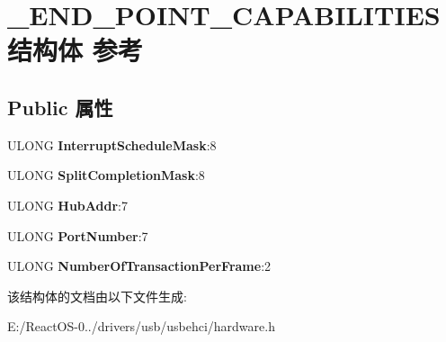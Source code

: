 \hypertarget{struct___e_n_d___p_o_i_n_t___c_a_p_a_b_i_l_i_t_i_e_s}{}\section{\+\_\+\+E\+N\+D\+\_\+\+P\+O\+I\+N\+T\+\_\+\+C\+A\+P\+A\+B\+I\+L\+I\+T\+I\+E\+S结构体 参考}
\label{struct___e_n_d___p_o_i_n_t___c_a_p_a_b_i_l_i_t_i_e_s}
\subsection*{Public 属性}
\begin{DoxyCompactItemize}
\item 
\mbox{\label{struct___e_n_d___p_o_i_n_t___c_a_p_a_b_i_l_i_t_i_e_s_ae9d782285662a014f1da0b5fdde743ac}} 
U\+L\+O\+NG {\bfseries Interrupt\+Schedule\+Mask}\+:8
\item 
\mbox{\label{struct___e_n_d___p_o_i_n_t___c_a_p_a_b_i_l_i_t_i_e_s_afca16b9a2837082f97aa3fff4db8a71c}} 
U\+L\+O\+NG {\bfseries Split\+Completion\+Mask}\+:8
\item 
\mbox{\label{struct___e_n_d___p_o_i_n_t___c_a_p_a_b_i_l_i_t_i_e_s_ad396af0a1941eeecf826a7c686aafec3}} 
U\+L\+O\+NG {\bfseries Hub\+Addr}\+:7
\item 
\mbox{\label{struct___e_n_d___p_o_i_n_t___c_a_p_a_b_i_l_i_t_i_e_s_abebd9761593d57fbcb80a046cb3613f0}} 
U\+L\+O\+NG {\bfseries Port\+Number}\+:7
\item 
\mbox{\label{struct___e_n_d___p_o_i_n_t___c_a_p_a_b_i_l_i_t_i_e_s_ac5b25d4de1ce28e61310c3a9c3922755}} 
U\+L\+O\+NG {\bfseries Number\+Of\+Transaction\+Per\+Frame}\+:2
\end{DoxyCompactItemize}


该结构体的文档由以下文件生成\+:\begin{DoxyCompactItemize}
\item 
E\+:/\+React\+O\+S-\/0../drivers/usb/usbehci/hardware.\+h\end{DoxyCompactItemize}
